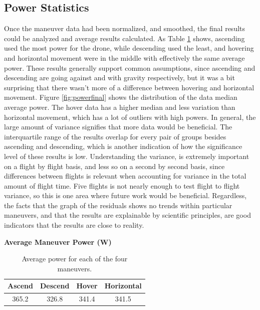 \documentclass{article}
\begin{document}
\subsection{Power Statistics}
Once the maneuver data had been normalized, and smoothed, the final results could be analyzed and average results calculated. As Table \ref{tab:man} shows, ascending used the most power for the drone, while descending used the least, and hovering and horizontal movement were in the middle with effectively the same average power. These results generally support common assumptions, since ascending and descending are going against and with gravity respectively, but it was a bit surprising that there wasn't more of a difference between hovering and horizontal movement. Figure \ref{fig:powerfinal} shows the distribution of the data median average power. The hover data has a higher median and less variation than horizontal movement, which has a lot of outliers with high powers. In general, the large amount of variance signifies that more data would be beneficial. The interquartile range of the results overlap for every pair of groups besides ascending and descending, which is another indication of how the significance level of these results is low. Understanding the variance, is extremely important on a flight by flight basis, and less so on a second by second basis, since differences between flights is relevant when accounting for variance in the total amount of flight time. Five flights is not nearly enough to test flight to flight variance, so this is one area where future work would be beneficial. Regardless, the facts that the graph of the residuals shows no trends within particular maneuvers, and that the results are explainable by scientific principles, are good indicators that the results are close to reality. 

\begin{table}[!h]
  \centering
  \large{\textbf{Average Maneuver Power (W)}}\par\medskip
  \begin{tabular}{cccc}
    \toprule
    \cmidrule(r){1-2}
    Ascend     & Descend     & Hover & Horizontal \\
    \midrule
    365.2 & 326.8  & 341.4 & 341.5    \\
    \bottomrule
  \end{tabular} \bigskip
  \caption{Average power for each of the four maneuvers.}
  \label{tab:man}
\end{table}
\end{document}
